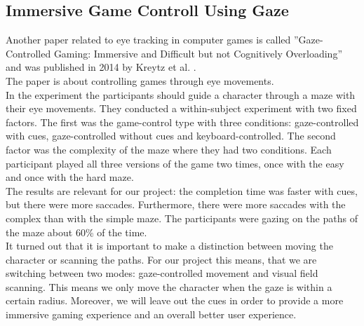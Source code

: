 \documentclass{sigchi}
\begin{document}
\subsection{Immersive Game Controll Using Gaze}
Another paper related to eye tracking in computer games is called ''Gaze-Controlled Gaming: Immersive and Difficult but not Cognitively Overloading'' and was published in 2014 by Kreytz et al. \cite{krejtz2014gaze}.\\
The paper is about controlling games through eye movements.\\
In the experiment the participants should guide a character through a maze with their eye movements. They conducted a within-subject experiment with two fixed factors. The first was the game-control type with three conditions: gaze-controlled with cues, gaze-controlled without cues and keyboard-controlled. The second factor was the complexity of the maze where they had two conditions. Each participant played all three versions of the game two times, once with the easy and once with the hard maze.\\
The results are relevant for our project: the completion time was faster with cues, but there were more saccades. Furthermore, there were more saccades with the complex than with the simple maze. The participants were gazing on the paths of the maze about 60\% of the time.\\
It turned out that it is important to make a distinction between moving the character or scanning the paths. For our project this means, that we are switching between two modes: gaze-controlled movement and visual field scanning. This means we only move the character when the gaze is within a certain radius. Moreover, we will leave out the cues in order to provide a more immersive gaming experience and an overall better user experience.
 
\end{document}
